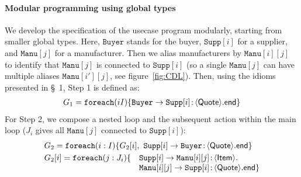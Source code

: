 \documentclass{LMCS}
\newcommand{\kf}[1]{\textup{\textsf{#1}}\xspace}
\newcommand{\G}{\ensuremath{G}}
\newcommand{\End}{\kf{end}}
\newcommand{\ENCan}[1]{\langle #1 \rangle}
\newcommand{\TO}[2]{#1\to #2}
\newcommand{\GS}[3]{\TO{#1}{#2}\colon \!\ENCan{#3}}
\newcommand{\ii}{\ensuremath{i}}
\newcommand{\jj}{\ensuremath{j}}
\newcommand{\II}{\ensuremath{I}}
\newcommand{\MERGE}[1]{\ensuremath{#1}}
\newcommand{\FOREACH}[3]{\ensuremath{\mathtt{foreach}(#1 #2)\{#3\}}}
\begin{document}
\paragraph{\bf Modular programming using global types}
We develop the specification of the usecase program modularly, 
starting from smaller global types. Here, 
$\texttt{Buyer}$ stands for the buyer, 
$\texttt{Supp}[\ii]$ for a supplier, 
and $\texttt{Manu}[\jj]$ for a manufacturer. Then we alias manufacturers by $\texttt{Manu}[\ii][\jj]$ to identify that $\texttt{Manu}[\jj]$ 
is connected to  $\texttt{Supp}[\ii]$ (so a single $\texttt{Manu}[\jj]$ can have multiple
aliases $\texttt{Manu}[\ii'][\jj]$, see figure~\ref{fig:CDL}). Then, using the idioms presented in \S~1, {\sc Step} 1 
is defined as:
\[ 
\begin{array}{lll}
\G_1 = 
\FOREACH{\ii}{\II}{
\GS{\texttt{Buyer}}{\texttt{Supp}[\ii]}{\mathsf{Quote}}.\End}
\end{array}
\]
For {\sc Step} 2, we compose a nested loop and the subsequent action
within the main loop ($J_i$ gives all $\texttt{Manu}[\jj]$ connected
to $\texttt{Supp}[\ii]$):  
{\small
\[ 
\begin{array}{ll}
\multicolumn{2}{l}{G_2 = \mathtt{foreach}({\ii}:{\II})\{
\MERGE{G_2[i],\
\GS{\texttt{Supp}[i]}{\texttt{Buyer}}{\mathsf{Quote}}.\End}\}} \\[1mm]
G_2[i]= \mathtt{foreach}({\jj}:{J_i})\{ & 
\GS{\texttt{Supp}[\ii]}{\texttt{Manu}[\ii][\jj]}{\mathsf{Item}}.\\
& \GS{\texttt{Manu}[\ii][\jj]}{\texttt{Supp}[\ii]}{\mathsf{Quote}}.\End\}
\end{array}
\]
}
\end{document}
